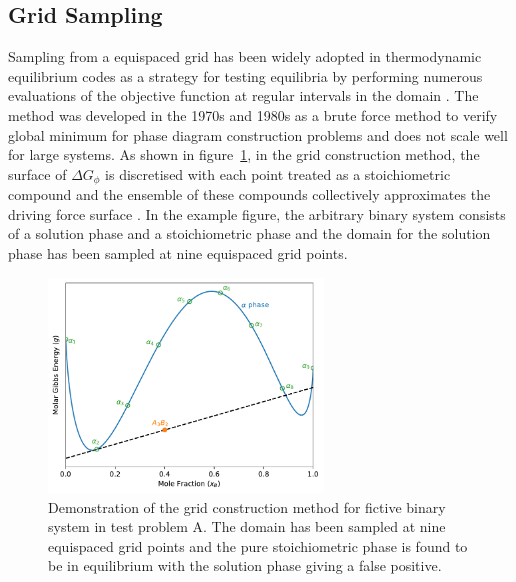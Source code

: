 	\subsection{Grid Sampling}
		Sampling from a equispaced grid has been widely adopted in thermodynamic equilibrium codes as a strategy for testing equilibria by performing numerous evaluations of the objective function at regular intervals in the domain \cite{Shobu09,Sundman85,Sundman15,Chen93a,Chen93b}. The method was developed in the 1970s and 1980s as a brute force method to verify global minimum for phase diagram construction problems and does not scale well for large systems. As shown in figure~\ref{fig:Grid_cons}, in the grid construction method, the surface of $\Delta G_\phi$ is discretised with each point treated as a stoichiometric compound and the ensemble of these compounds collectively approximates the driving force surface \cite{Piro16}. In the example figure, the arbitrary binary system consists of a solution phase and a stoichiometric phase and the domain for the solution phase has been sampled at nine equispaced grid points.
	\begin{figure}[htbp]
		\centering
		\includegraphics[width=0.65\textwidth]{figures/chapter-6/System_AB_grid.pdf}
		\caption{Demonstration of the grid construction method for fictive binary system in test problem A. The domain has been sampled at nine equispaced grid points and the pure stoichiometric phase  is found to be in equilibrium with the solution phase giving a false positive.}
		\label{fig:Grid_cons}
	\end{figure}

